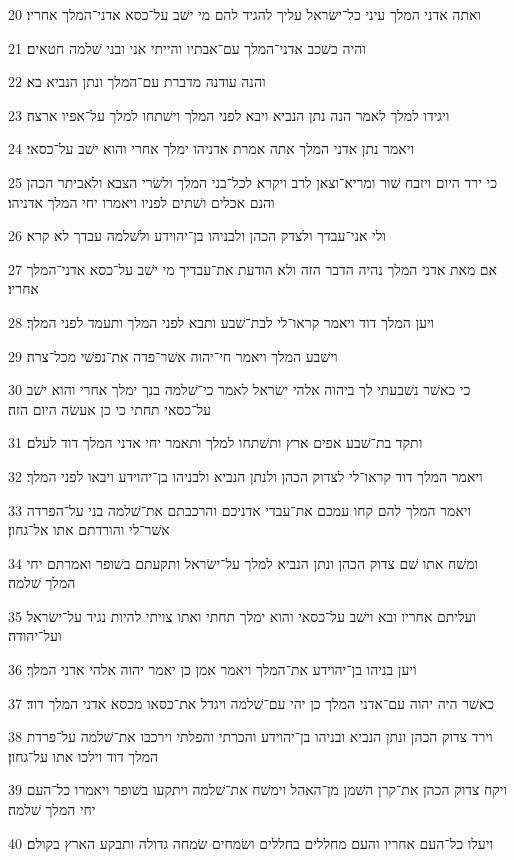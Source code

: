 \par 20 ואתה אדני המלך עיני כל־ישׂראל עליך להגיד להם מי ישׁב על־כסא אדני־המלך אחריו׃
\par 21 והיה כשׁכב אדני־המלך עם־אבתיו והייתי אני ובני שׁלמה חטאים׃
\par 22 והנה עודנה מדברת עם־המלך ונתן הנביא בא׃
\par 23 ויגידו למלך לאמר הנה נתן הנביא ויבא לפני המלך וישׁתחו למלך על־אפיו ארצה׃
\par 24 ויאמר נתן אדני המלך אתה אמרת אדניהו ימלך אחרי והוא ישׁב על־כסאי׃
\par 25 כי ירד היום ויזבח שׁור ומריא־וצאן לרב ויקרא לכל־בני המלך ולשׂרי הצבא ולאביתר הכהן והנם אכלים ושׁתים לפניו ויאמרו יחי המלך אדניהו׃
\par 26 ולי אני־עבדך ולצדק הכהן ולבניהו בן־יהוידע ולשׁלמה עבדך לא קרא׃
\par 27 אם מאת אדני המלך נהיה הדבר הזה ולא הודעת את־עבדיך מי ישׁב על־כסא אדני־המלך אחריו׃
\par 28 ויען המלך דוד ויאמר קראו־לי לבת־שׁבע ותבא לפני המלך ותעמד לפני המלך׃
\par 29 וישׁבע המלך ויאמר חי־יהוה אשׁר־פדה את־נפשׁי מכל־צרה׃
\par 30 כי כאשׁר נשׁבעתי לך ביהוה אלהי ישׂראל לאמר כי־שׁלמה בנך ימלך אחרי והוא ישׁב על־כסאי תחתי כי כן אעשׂה היום הזה׃
\par 31 ותקד בת־שׁבע אפים ארץ ותשׁתחו למלך ותאמר יחי אדני המלך דוד לעלם׃
\par 32 ויאמר המלך דוד קראו־לי לצדוק הכהן ולנתן הנביא ולבניהו בן־יהוידע ויבאו לפני המלך׃
\par 33 ויאמר המלך להם קחו עמכם את־עבדי אדניכם והרכבתם את־שׁלמה בני על־הפרדה אשׁר־לי והורדתם אתו אל־גחון׃
\par 34 ומשׁח אתו שׁם צדוק הכהן ונתן הנביא למלך על־ישׂראל ותקעתם בשׁופר ואמרתם יחי המלך שׁלמה׃
\par 35 ועליתם אחריו ובא וישׁב על־כסאי והוא ימלך תחתי ואתו צויתי להיות נגיד על־ישׂראל ועל־יהודה׃
\par 36 ויען בניהו בן־יהוידע את־המלך ויאמר אמן כן יאמר יהוה אלהי אדני המלך׃
\par 37 כאשׁר היה יהוה עם־אדני המלך כן יהי עם־שׁלמה ויגדל את־כסאו מכסא אדני המלך דוד׃
\par 38 וירד צדוק הכהן ונתן הנביא ובניהו בן־יהוידע והכרתי והפלתי וירכבו את־שׁלמה על־פרדת המלך דוד וילכו אתו על־גחון׃
\par 39 ויקח צדוק הכהן את־קרן השׁמן מן־האהל וימשׁח את־שׁלמה ויתקעו בשׁופר ויאמרו כל־העם יחי המלך שׁלמה׃
\par 40 ויעלו כל־העם אחריו והעם מחללים בחללים ושׂמחים שׂמחה גדולה ותבקע הארץ בקולם׃
